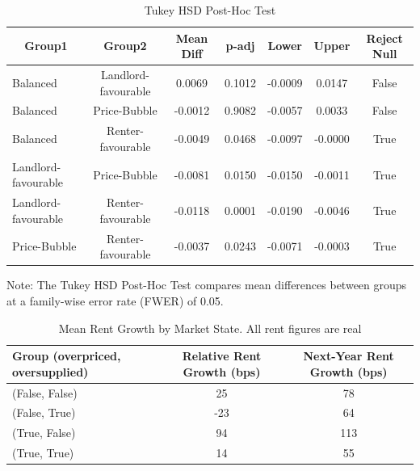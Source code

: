 \documentclass[APA,Times1COL]{WileyNJDv5} %
\begin{document}
\begin{table}[t]
	\centering
	\begin{threeparttable}
		\caption{Tukey HSD Post-Hoc Test\label{tab:tukey}}
		\begin{tabular}{lcccccc}
			\toprule
			\multicolumn{1}{c}{Group1} & Group2             & Mean Diff & p-adj  & Lower  & Upper & Reject Null\\
			\midrule
			Balanced               & Landlord-favourable  & 0.0069   & 0.1012 & -0.0009 & 0.0147  & False \\
			Balanced               & Price-Bubble         & -0.0012  & 0.9082 & -0.0057 & 0.0033  & False \\
			Balanced               & Renter-favourable    & -0.0049  & 0.0468 & -0.0097 & -0.0000 & True  \\
			Landlord-favourable    & Price-Bubble         & -0.0081  & 0.0150 & -0.0150 & -0.0011 & True  \\
			Landlord-favourable    & Renter-favourable    & -0.0118  & 0.0001 & -0.0190 & -0.0046 & True  \\
			Price-Bubble           & Renter-favourable    & -0.0037  & 0.0243 & -0.0071 & -0.0003 & True  \\
			\bottomrule
		\end{tabular}
		\begin{tablenotes}
			\footnotesize
			\item Note: The Tukey HSD Post-Hoc Test compares mean differences between groups at a family-wise error rate (FWER) of 0.05. 
		\end{tablenotes}
	\end{threeparttable}
\end{table}


\begin{table}[h!]
	\centering
	\caption*{Mean Rent Growth by Market State. All rent figures are real}
	\label{tab:simplifiedmeans}
	\begin{tabular}{lcc}
		\toprule
		\textbf{Group (overpriced, oversupplied)} & \textbf{Relative Rent Growth (bps)} & \textbf{Next-Year Rent Growth (bps)} \\
		\midrule
		(False, False) & 25 & 78 \\
		(False, True)  & -23 & 64 \\
		(True, False)  & 94 & 113 \\
		(True, True)   & 14 & 55 \\
		\bottomrule
	\end{tabular}
\end{table}
\end{document}
